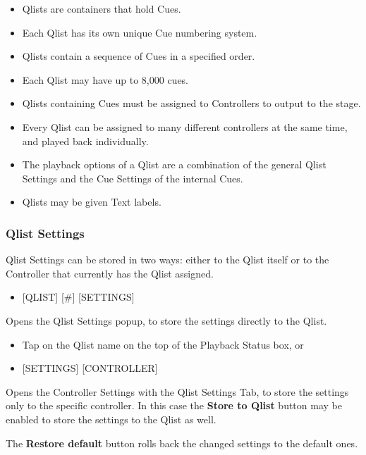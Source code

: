 \documentclass[
]{article}
\providecommand{\tightlist}{%
  \setlength{\itemsep}{0pt}\setlength{\parskip}{0pt}}
\begin{document}
\begin{itemize}
\item
  Qlists are containers that hold Cues.
\item
  Each Qlist has its own unique Cue numbering system.
\item
  Qlists contain a sequence of Cues in a specified order.
\item
  Each Qlist may have up to 8,000 cues.
\item
  Qlists containing Cues must be assigned to Controllers to output to the stage.
\item
  Every Qlist can be assigned to many different controllers at the same time, and played back individually.
\item
  The playback options of a Qlist are a combination of the general Qlist Settings and the Cue
  Settings of the internal Cues.
\item
  Qlists may be given Text labels.
\end{itemize}

\hypertarget{qlist-settings-1}{%
\subsubsection{Qlist Settings}\label{qlist-settings-1}}

Qlist Settings can be stored in two ways: either to the Qlist itself or to the Controller that currently has the Qlist assigned.

\begin{itemize}
\tightlist
\item
  {[}QLIST{]} {[}\#{]} {[}SETTINGS{]}
\end{itemize}

Opens the Qlist Settings popup, to store the settings directly to the Qlist.

\begin{itemize}
\item
  Tap on the Qlist name on the top of the Playback Status box, or
\item
  {[}SETTINGS{]} {[}CONTROLLER{]}
\end{itemize}

Opens the Controller Settings with the Qlist Settings Tab, to store the settings only to the specific controller. In this case the \textbf{Store to Qlist} button may be enabled to store the settings to the Qlist as well.

The \textbf{Restore default} button rolls back the changed settings to the default ones.
\end{document}
